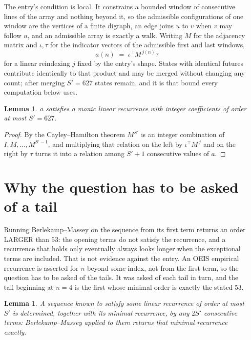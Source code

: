 \documentclass[11pt,a4paper]{article}
\theoremstyle{plain}
\newtheorem{lemma}[theorem]{Lemma}
\theoremstyle{definition}
\begin{document}
The entry's condition is local. It constrains a bounded window of consecutive lines of the
array and nothing beyond it, so the admissible configurations of one window are the vertices of
a finite digraph, an edge joins $u$ to $v$ when $v$ may follow $u$, and an admissible array is
exactly a walk. Writing $M$ for the adjacency matrix and $\iota,\tau$ for the indicator vectors
of the admissible first and last windows,
\[
a(n)\;=\;\iota^{\!\top}M^{\,j(n)}\tau
\]
for a linear reindexing $j$ fixed by the entry's shape. States with identical futures
contribute identically to that product and may be merged without changing any count; after
merging $S'=627$ states remain, and it is that bound every computation below uses.

\begin{lemma}\label{lem:cf}
$a$ satisfies a monic linear recurrence with integer coefficients of order at most $S'=627$.
\end{lemma}

\begin{proof}
By the Cayley--Hamilton theorem $M^{S'}$ is an integer combination of $I,M,\dots,M^{S'-1}$,
and multiplying that relation on the left by $\iota^{\!\top}M^{\,j}$ and on the right by
$\tau$ turns it into a relation among $S'+1$ consecutive values of $a$.
\end{proof}

\section{Why the question has to be asked of a tail}

Running Berlekamp--Massey on the sequence from its first term returns an order LARGER than $53$: the opening terms do not satisfy the recurrence, and a recurrence that holds only eventually always looks longer when the exceptional terms are included. That is not evidence against the entry. An OEIS empirical recurrence is asserted for $n$ beyond some index, not from the first term, so the question has to be asked of the tails. It was asked of each tail in turn, and the tail beginning at $n=4$ is the first whose minimal order is exactly the stated $53$.

\begin{lemma}\label{lem:bm}
A sequence known to satisfy some linear recurrence of order at most $S'$ is determined,
together with its minimal recurrence, by any $2S'$ consecutive terms: Berlekamp--Massey applied
to them returns that minimal recurrence exactly.
\end{lemma}
\end{document}
